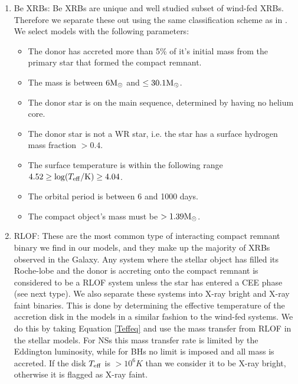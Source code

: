 \documentclass{pas}
\begin{document}
\begin{enumerate}
Provided that $T_{\rm eff}\geq10^{6}K$ and the system has an initial period $<10^4$ days, we consider the system to be a wind-fed X-ray binary. The temperature cut-off allows us to filter out systems with inadequate accretion rates as these are unlikely to be detectable in X-rays. We note that we only consider systems to be wind-fed if they have yet to fill their Roche-lobe. Finally, we do not include any mass cut-off to allow for all donor masses. It should be noted that we don't model wind-fed accretion beyond this, meaning we do not model direct impact accretion and assume that the material forms some sort of accretion disk. 
 
   
    
    \item Be XRBs: Be XRBs are unique and well studied subset of wind-fed XRBs. Therefore we separate these out using the same classification scheme as in \citet{2025MNRAS.542.2087B}. We select models with the following parameters:
    \begin{itemize}
        \item The donor has accreted more than 5\% of it's initial mass from the primary star that formed the compact remnant.
        \item The mass is between $6\rm{M_{\odot}}$ and $\le30.1\rm{M_{\odot}}$. 
        \item The donor star is on the main sequence, determined by having no helium core.
        \item The donor star is not a WR star, i.e.  the star has a surface hydrogen mass fraction $>0.4$.
        \item The surface temperature is within the following range $4.52 \ge\log (T_{\rm eff}/{\rm K}) \ge 4.04$.
        \item The orbital period is between 6 and 1000 days.
        \item The compact object's mass must be $>1.39\rm{M_\odot}$. 
\end{itemize}

    \item RLOF: These are the most common type of interacting compact remnant binary we find in our models, and they make up the majority of XRBs observed in the Galaxy. Any system where the stellar object has filled its Roche-lobe and the donor is accreting onto the compact remnant is considered to be a RLOF system unless the star has entered a CEE phase (see next type). We also separate these systems into X-ray bright and X-ray faint binaries. This is done by determining the effective temperature of the accretion disk in the models in a similar fashion to the wind-fed systems. We do this by taking Equation \ref{Teffeq} and use the mass transfer from RLOF in the stellar models. For NSs this mass transfer rate is limited by the Eddington luminosity, while for BHs no limit is imposed and all mass is accreted. If the disk $T_{\rm{eff}}$ is $>10^6K$ than we consider it to be X-ray bright, otherwise it is flagged as X-ray faint. 
    

\end{enumerate}
\end{document}
